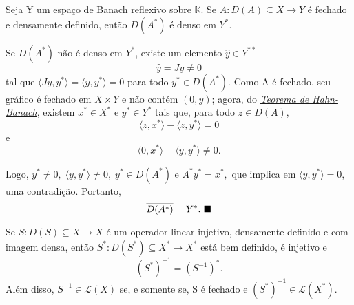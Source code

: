 \documentclass[../functional_analysis.tex]{subfiles}
\begin{document}
\begin{lemma*}
	Seja Y um espaço de Banach reflexivo sobre \(\mathbb{K}.\) Se \(A:D(A)\subseteq X\rightarrow Y\) é fechado e densamente definido, então \(D(A^{*})\) é denso em \(Y^{*}.\)
\end{lemma*}
\begin{proof*}
	Se \(D(A^{*})\) não é denso em \(Y^{*}\), existe um elemento \(\hat{y}\in Y^{**}\)
	\[
		\hat{y}=Jy \neq  0
	\]
	tal que \(\langle Jy, y^{*} \rangle=\langle y, y^{*} \rangle=0\) para todo \(y^{*}\in D(A^{*})\). Como A é fechado, seu gráfico é fechado em \(X\times Y\)
	e não contém \((0, y)\); agora, do \hyperlink{hahn_banach}{\textit{Teorema de Hahn-Banach}}, existem \(x^{*}\in X^{*}\) e \(y^{*}\in Y^{*}\) tais que, para
	todo \(z\in D(A)\),
	\[
		\langle z, x^{*} \rangle-\langle z, y^{*} \rangle=0
	\]
	e
	\[
		\langle 0, x^{*} \rangle - \langle y, y^{*} \rangle\neq 0.
	\]

	Logo, \(y^{*}\neq 0,\; \langle y, y^{*} \rangle\neq 0,\; y^{*}\in D(A^{*})\) e \(A^{*}y^{*}=x^{*},\) que implica em \(\langle y, y^{*} \rangle=0\), uma contradição. Portanto,
	\[
		\overline{D(A^{*})} = Y^{*}. \text{ $\blacksquare$}
	\]
\end{proof*}
\begin{theorem*}
	Se \(S:D(S)\subseteq X\rightarrow X\) é um operador linear injetivo, densamente definido e com imagem densa, então \(S^{*}:D(S^{*})\subseteq X^{*}\rightarrow X^{*}\) está bem definido, é injetivo e
	\[
		(S^{*})^{-1}=(S^{-1})^{*}.
	\]
	Além disso, \(S^{-1}\in \mathcal{L}(X)\) se, e somente se, S é fechado e \((S^{*})^{-1}\in \mathcal{L}(X^{*})\).
\end{theorem*}
\end{document}
